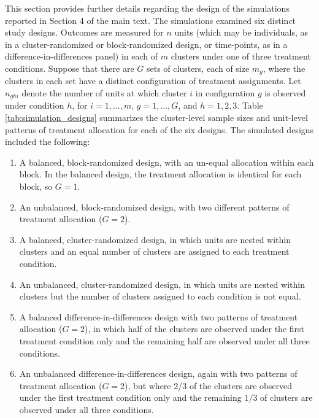 \documentclass{article}\usepackage[]{graphicx}\usepackage[]{color}
\begin{document}
This section provides further details regarding the design of the simulations reported in Section 4 of the main text. The simulations examined six distinct study designs. Outcomes are measured for $n$ units (which may be individuals, as in a cluster-randomized or block-randomized design, or time-points, as in a difference-in-differences panel) in each of $m$ clusters under one of three treatment conditions. Suppose that there are $G$ sets of clusters, each of size $m_g$, where the clusters in each set have a distinct configuration of treatment assignments. Let $n_{ghi}$ denote the number of units at which cluster $i$ in configuration $g$ is observed under condition $h$, for $i=1,...,m$, $g = 1,...,G$, and $h = 1,2,3$. Table \ref{tab:simulation_designs} summarizes the cluster-level sample sizes and unit-level patterns of treatment allocation for each of the six designs. The simulated designs included the following:  
\begin{enumerate}
\item A balanced, block-randomized design, with an un-equal allocation within each block. In the balanced design, the treatment allocation is identical for each block, so $G = 1$.
\item An unbalanced, block-randomized design, with two different patterns of treatment allocation ($G = 2$).
\item A balanced, cluster-randomized design, in which units are nested within clusters and an equal number of clusters are assigned to each treatment condition.
\item An unbalanced, cluster-randomized design, in which units are nested within clusters but the number of clusters assigned to each condition is not equal. 
\item A balanced difference-in-differences design with two patterns of treatment allocation ($G = 2$), in which half of the clusters are observed under the first treatment condition only and the remaining half are observed under all three conditions.
\item An unbalanced difference-in-differences design, again with two patterns of treatment allocation ($G = 2$), but where 2/3 of the clusters are observed under the first treatment condition only and the remaining $1 / 3$ of clusters are observed under all three conditions.
\end{enumerate}
\end{document}
